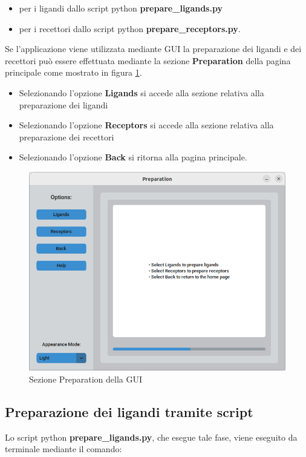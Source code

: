 \begin{itemize}
    \item per i ligandi dallo script python \textbf{prepare\_ligands.py}
    \item per i recettori dallo script python \textbf{prepare\_receptors.py}.
\end{itemize}

Se l'applicazione viene utilizzata mediante GUI la preparazione dei ligandi e dei recettori può essere effettuata mediante la sezione \textbf{Preparation} della pagina principale come mostrato in figura \ref{fig:preparation}.

\begin{itemize}
    \item Selezionando l'opzione \textbf{Ligands} si accede alla sezione relativa alla preparazione dei ligandi
    \item Selezionando l'opzione \textbf{Receptors} si accede alla sezione relativa alla preparazione dei recettori
    \item Selezionando l'opzione \textbf{Back} si ritorna alla pagina principale.
\end{itemize}


\begin{figure}[H]
    \centering
    \includegraphics[scale=0.6]{immagini/capitolo3/preparation.png}
    \caption{Sezione Preparation della GUI}
    \label{fig:preparation}
\end{figure}

\subsection{Preparazione dei ligandi tramite script} \label{Preparazione dei ligandi script}
Lo script python \textbf{prepare\_ligands.py}, che esegue tale fase, viene eseguito da terminale mediante il comando:

